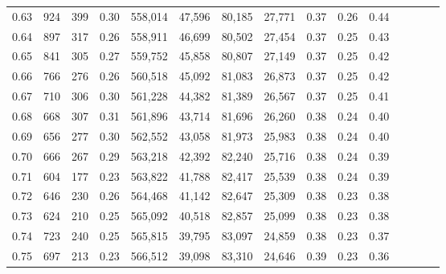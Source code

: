 \begin{tabular}{rrrcrrrrrrrrrrr}
0.63 &     924 &     399 &                                       0.30 &  558,014 &   47,596 &   80,185 &   27,771 &  0.37 &  0.26 &                         0.44 \\
0.64 &     897 &     317 &                                       0.26 &  558,911 &   46,699 &   80,502 &   27,454 &  0.37 &  0.25 &                         0.43 \\
0.65 &     841 &     305 &                                       0.27 &  559,752 &   45,858 &   80,807 &   27,149 &  0.37 &  0.25 &                         0.42 \\
0.66 &     766 &     276 &                                       0.26 &  560,518 &   45,092 &   81,083 &   26,873 &  0.37 &  0.25 &                         0.42 \\
0.67 &     710 &     306 &                                       0.30 &  561,228 &   44,382 &   81,389 &   26,567 &  0.37 &  0.25 &                         0.41 \\
0.68 &     668 &     307 &                                       0.31 &  561,896 &   43,714 &   81,696 &   26,260 &  0.38 &  0.24 &                         0.40 \\
0.69 &     656 &     277 &                                       0.30 &  562,552 &   43,058 &   81,973 &   25,983 &  0.38 &  0.24 &                         0.40 \\
0.70 &     666 &     267 &                                       0.29 &  563,218 &   42,392 &   82,240 &   25,716 &  0.38 &  0.24 &                         0.39 \\
0.71 &     604 &     177 &                                       0.23 &  563,822 &   41,788 &   82,417 &   25,539 &  0.38 &  0.24 &                         0.39 \\
0.72 &     646 &     230 &                                       0.26 &  564,468 &   41,142 &   82,647 &   25,309 &  0.38 &  0.23 &                         0.38 \\
0.73 &     624 &     210 &                                       0.25 &  565,092 &   40,518 &   82,857 &   25,099 &  0.38 &  0.23 &                         0.38 \\
0.74 &     723 &     240 &                                       0.25 &  565,815 &   39,795 &   83,097 &   24,859 &  0.38 &  0.23 &                         0.37 \\
0.75 &     697 &     213 &                                       0.23 &  566,512 &   39,098 &   83,310 &   24,646 &  0.39 &  0.23 &                         0.36 \\

\end{tabular}
